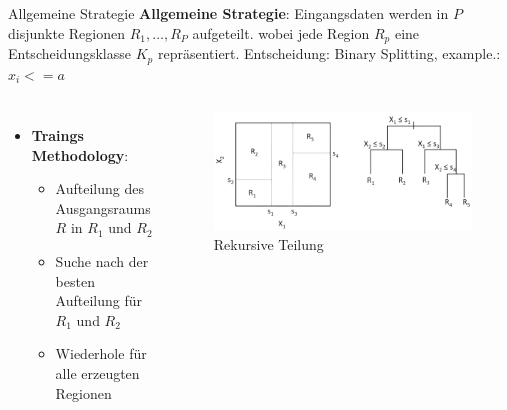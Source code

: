 \documentclass{beamer}
\begin{document}
\begin{frame}{Allgemeine Strategie}
	\textbf{Allgemeine Strategie}: Eingangsdaten werden in $P$ disjunkte Regionen $R_1,\dots,R_P$ aufgeteilt. 
	wobei jede Region $R_p$ eine Entscheidungsklasse $K_p$ repräsentiert. 
 Entscheidung: {Binary Splitting}, example.: $x_i <= a$
	\begin{columns}
  \begin{itemize}
				\item{\textbf{Traings Methodology}:}
				\begin{itemize}
					\item {Aufteilung des Ausgangsraums $R$ in $R_1$ und $R_2$}
					\item{Suche nach der besten Aufteilung für $R_1$ und $R_2$}
					\item{Wiederhole für alle erzeugten Regionen}
				\end{itemize}
			\end{itemize}
			
			\begin{figure}
				\includegraphics[width=\linewidth]{Images/split.png}
				\caption{Rekursive Teilung \cite{hastie_tibshirani_friedman}}
			\end{figure}
	\end{columns}
	
\end{frame}
\end{document}
